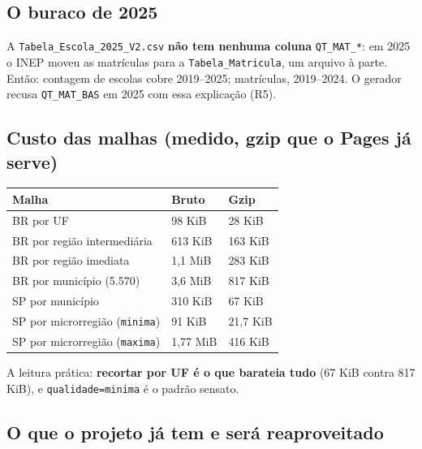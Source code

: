 \documentclass[11pt]{article}
\begin{document}
\subsection{O buraco de 2025}
\label{sec:orgfee20d9}

A \texttt{Tabela\_Escola\_2025\_V2.csv} \textbf{não tem nenhuma coluna} \texttt{QT\_MAT\_*}: em 2025 o
INEP moveu as matrículas para a \texttt{Tabela\_Matricula}, um arquivo à parte.
Então: contagem de escolas cobre 2019–2025; matrículas, 2019–2024. O
gerador recusa \texttt{QT\_MAT\_BAS} em 2025 com essa explicação (R5).
\subsection{Custo das malhas (medido, gzip que o Pages já serve)}
\label{sec:org8dbdea6}

\begin{center}
\begin{tabular}{lll}
Malha & Bruto & Gzip\\
\hline
BR por UF & 98 KiB & 28 KiB\\
BR por região intermediária & 613 KiB & 163 KiB\\
BR por região imediata & 1,1 MiB & 283 KiB\\
BR por município (5.570) & 3,6 MiB & 817 KiB\\
SP por município & 310 KiB & 67 KiB\\
SP por microrregião (\texttt{minima}) & 91 KiB & 21,7 KiB\\
SP por microrregião (\texttt{maxima}) & 1,77 MiB & 416 KiB\\
\end{tabular}
\end{center}

A leitura prática: \textbf{recortar por UF é o que barateia tudo} (67 KiB contra
817 KiB), e \texttt{qualidade=minima} é o padrão sensato.
\subsection{O que o projeto já tem e será reaproveitado}
\label{sec:org29afb27}
\end{document}
